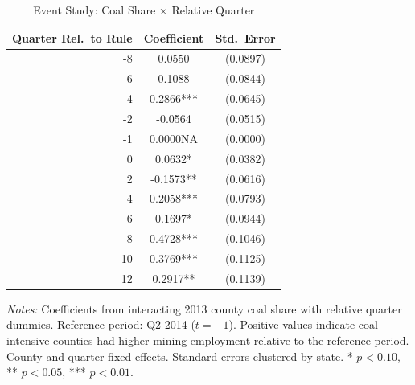 \begin{table}[htbp]
\centering
\caption{Event Study: Coal Share $\times$ Relative Quarter}
\label{tab:eventstudy}
\begin{threeparttable}
\begin{tabular}{rcc}
\toprule
Quarter Rel.\ to Rule & Coefficient & Std.\ Error \\
\midrule
-8 & 0.0550 & (0.0897) \\
-6 & 0.1088 & (0.0844) \\
-4 & 0.2866*** & (0.0645) \\
-2 & -0.0564 & (0.0515) \\
-1 & 0.0000NA & (0.0000) \\
0 & 0.0632* & (0.0382) \\
2 & -0.1573** & (0.0616) \\
4 & 0.2058*** & (0.0793) \\
6 & 0.1697* & (0.0944) \\
8 & 0.4728*** & (0.1046) \\
10 & 0.3769*** & (0.1125) \\
12 & 0.2917** & (0.1139) \\
\bottomrule
\end{tabular}
\begin{tablenotes}[flushleft]\small
\item \textit{Notes:} Coefficients from interacting 2013 county coal share with relative quarter dummies. Reference period: Q2 2014 ($t = -1$). Positive values indicate coal-intensive counties had higher mining employment relative to the reference period. County and quarter fixed effects. Standard errors clustered by state. * $p<0.10$, ** $p<0.05$, *** $p<0.01$.
\end{tablenotes}
\end{threeparttable}
\end{table}

